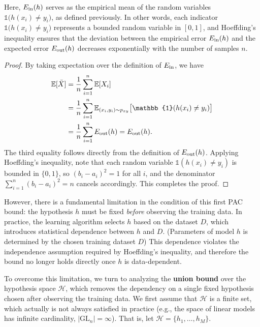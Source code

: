 \documentclass[../main]{subfiles}
\begin{document}
Here, $E_{\rm in}(h)$ serves as the empirical mean of the random variables  
$\mathbb{1}\!\big(h(x_i) \neq y_i\big)$, as defined previously.  
In other words, each indicator $\mathbb{1}\!\big(h(x_i) \neq y_i\big)$ represents a bounded random variable in $[0,1]$,  
and Hoeffding’s inequality ensures that the deviation between the empirical error $E_{\rm in}(h)$  
and the expected error $E_{\rm out}(h)$ decreases exponentially with the number of samples $n$.
\begin{proof}
    By taking expectation over the definition of $E_{\rm in}$, we have
    \begin{align*}
        \mathbb{E}[\bar{X}]
        &= \frac{1}{n}\sum_{i=1}^n \mathbb{E}[X_i] \\
        &= \frac{1}{n}\sum_{i=1}^n \mathbb{E}_{(x_i,y_i)\sim p_{xy}}
           \big[\mathbb{1}(h(x_i)\neq y_i)\big] \\
        &= \frac{1}{n}\sum_{i=1}^n E_{\rm out}(h)
        = E_{\rm out}(h).
    \end{align*}
    The third equality follows directly from the definition of $E_{\rm out}(h)$.  
    Applying Hoeffding’s inequality, note that each random variable $\mathbb{1}(h(x_i)\neq y_i)$ is bounded in $\{0,1\}$,  
    so $(b_i - a_i)^2 = 1$ for all $i$, and the denominator $\sum_{i=1}^n (b_i - a_i)^2 = n$ cancels accordingly.  
    This completes the proof.
    \end{proof}
    
    However, there is a fundamental limitation in the condition of this first PAC bound:  
    the hypothesis $h$ must be fixed \emph{before} observing the training data.  
    In practice, the learning algorithm selects $h$ based on the dataset $D$,  
    which introduces statistical dependence between $h$ and $D$. (Parameters of model $h$ is determined by the chosen training dataset $D$) 
    This dependence violates the independence assumption required by Hoeffding’s inequality,  
    and therefore the bound no longer holds directly once $h$ is data-dependent.

    To overcome this limitation, we turn to analyzing the \textbf{union bound} over the hypothesis space $\mathcal{H}$,  
    which removes the dependency on a single fixed hypothesis chosen after observing the training data.  
    We first assume that $\mathcal{H}$ is a finite set, which actually is not always satisfied in practice  
    (e.g., the space of linear models has infinite cardinality, $|\mathrm{GL}_n| = \infty$).  
    That is, let $\mathcal{H} = \{h_1, \dots, h_M\}$.  
    
\end{document}
